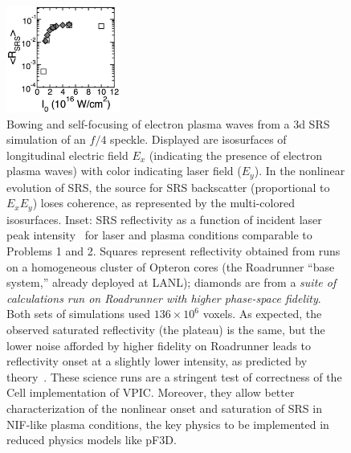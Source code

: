 \documentclass[journal,twoside]{IEEEtran}
\begin{document}
\begin{figure}
\begin{center}


\vspace{-1.5in}
\hspace{-5.25in}
\includegraphics[height=1.375in]{figs/lpi_comparison.eps}

\vspace{0.125in}
\caption{
Bowing and self-focusing of electron plasma waves from a 3d SRS
simulation of an $f/4$ speckle.  Displayed are isosurfaces of
longitudinal electric field $E_x$ (indicating the presence of electron
plasma waves) with color indicating laser field ($E_y$).  In the
nonlinear evolution of SRS, the source for SRS backscatter
(proportional to $E_x E_y$) loses coherence, as represented by the
multi-colored isosurfaces.  Inset: SRS reflectivity as a function of
incident laser peak intensity~\cite{AAC_Conference_Paper} for laser
and plasma conditions comparable to Problems 1 and 2.  Squares
represent reflectivity obtained from runs on a homogeneous cluster of
Opteron cores (the Roadrunner ``base system,'' already deployed at
LANL); diamonds are from a \textit{suite of calculations run on
Roadrunner with higher phase-space fidelity}.  Both sets of
simulations used $136 \times 10^6$ voxels.  As expected, the observed
saturated reflectivity (the plateau) is the same, but the lower noise
afforded by higher fidelity on Roadrunner leads to reflectivity onset
at a slightly lower intensity, as predicted by
theory~\cite{Yin_et_al_Phys_Plasmas_2006}.  These science runs are a
stringent test of correctness of the Cell implementation of VPIC.
Moreover, they allow better characterization of the nonlinear onset
and saturation of SRS in NIF-like plasma conditions, the key physics
to be implemented in reduced physics models like pF3D.}
\label{fig:lpi}
\end{center}
\end{figure}
\end{document}
